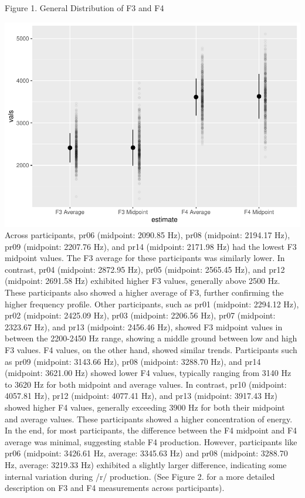 \documentclass[
  man]{apa6}
\begin{document}
Figure 1.
General Distribution of F3 and F4

\includegraphics{paper_files/figure-latex/unnamed-chunk-4-1.pdf}
Across participants, pr06 (midpoint: 2090.85 Hz), pr08 (midpoint: 2194.17 Hz), pr09 (midpoint: 2207.76 Hz), and pr14 (midpoint: 2171.98 Hz) had the lowest F3 midpoint values. The F3 average for these participants was similarly lower. In contrast, pr04 (midpoint: 2872.95 Hz), pr05 (midpoint: 2565.45 Hz), and pr12 (midpoint: 2691.58 Hz) exhibited higher F3 values, generally above 2500 Hz. These participants also showed a higher average of F3, further confirming the higher frequency profile. Other participants, such as pr01 (midpoint: 2294.12 Hz), pr02 (midpoint: 2425.09 Hz), pr03 (midpoint: 2206.56 Hz), pr07 (midpoint: 2323.67 Hz), and pr13 (midpoint: 2456.46 Hz), showed F3 midpoint values in between the 2200-2450 Hz range, showing a middle ground between low and high F3 values.
F4 values, on the other hand, showed similar trends. Participants such as pr09 (midpoint: 3143.66 Hz), pr08 (midpoint: 3288.70 Hz), and pr14 (midpoint: 3621.00 Hz) showed lower F4 values, typically ranging from 3140 Hz to 3620 Hz for both midpoint and average values. In contrast, pr10 (midpoint: 4057.81 Hz), pr12 (midpoint: 4077.41 Hz), and pr13 (midpoint: 3917.43 Hz) showed higher F4 values, generally exceeding 3900 Hz for both their midpoint and average values. These participants showed a higher concentration of energy. In the end, for most participants, the difference between the F4 midpoint and F4 average was minimal, suggesting stable F4 production. However, participants like pr06 (midpoint: 3426.61 Hz, average: 3345.63 Hz) and pr08 (midpoint: 3288.70 Hz, average: 3219.33 Hz) exhibited a slightly larger difference, indicating some internal variation during /r/ production. (See Figure 2. for a more detailed description on F3 and F4 measurements across participants).
\end{document}
